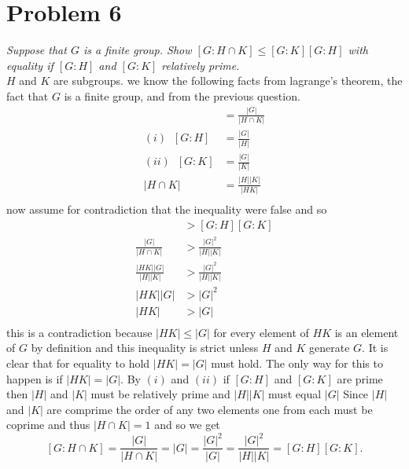 \documentclass{article}
\begin{document}
    \section{Problem 6}
    \emph{
        Suppose that $G$ is a finite group. Show $[G : H \cap K] \le [G : K][G : H]$ with
        equality if $[G : H]$ and $[G : K]$ relatively prime.
    }\\
    $H$ and $K$ are subgroups.
    we know the following facts from lagrange's theorem, the fact that $G$ is a finite group, and from the previous question.
    \begin{align*}
        [G : H \cap K] &= \frac{|G|}{|H \cap K|}\\
        (i) \;\; [G : H] &= \frac{|G|}{|H|}\\
        (ii) \; \;[G : K] &= \frac{|G|}{|K|}\\
        |H \cap K| &= \frac{|H||K|}{|HK|}\\
    \end{align*}
    now assume for contradiction that the inequality were false and so
    \begin{align*}
        [G : H \cap K] &> [G: H][G: K]\\
        \frac{|G|}{|H \cap K|} &> \frac{|G|^2}{|H||K|}\\
        \frac{|HK||G|}{|H||K|} &> \frac{|G|^2}{|H||K|}\\
        |HK||G| & > |G|^2\\
        |HK| &> |G|\\
    \end{align*}
    this is a contradiction because $|HK| \le |G|$ for every element of $HK$ is an element of $G$ by definition and this inequality is strict unless $H$ and $K$ generate $G$.
    It is clear that for equality to hold $|HK| = |G|$ must hold. The only way for this to happen is if $|HK| = |G|$.
    By $(i)$ and $(ii)$ if $[G : H]$ and $[G : K]$ are prime then  $|H|$ and $|K|$ must be relatively prime and $|H||K|$ must equal $|G|$ 
    Since $|H|$ and $|K|$ are comprime the order of any two elements one from each must be coprime and thus  $|H \cap K| = 1$ and so
    we get
    \[
        [G : H \cap K] = \frac{|G|}{|H \cap K|} = |G| = \frac{|G|^2}{|G|} = \frac{|G|^2}{|H||K|} = [G:H][G:K]
    .\] 
\end{document}
